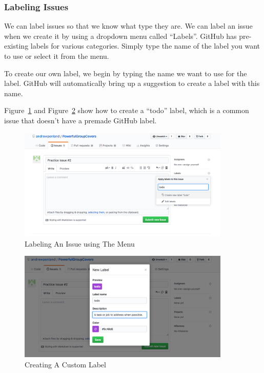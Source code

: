 \documentclass[11pt]{article}
\begin{document}
\subsubsection{Labeling Issues}

We can label issues so that we know what type they are. We can label an issue when we create it by using a dropdown menu called ``Labels''. GitHub has pre-existing labels for various categories. Simply type the name of the label you want to use or select it from the menu. 

To create our own label, we begin by typing the name we want to use for the label. GitHub will automatically bring up a suggestion to create a label with this name.

Figure~\ref{fig:begin-typing-todo} and Figure~\ref{fig:todo-label-details} show how to create a ``todo'' label, which is a common issue that doesn't have a premade GitHub label. 


\begin{figure}\label{fig:begin-typing-todo}
\includegraphics[width=0.9\textwidth]{CreatingLabels}
\caption{Labeling An Issue using The Menu}
\end{figure}

\begin{figure}\label{fig:todo-label-details}
\includegraphics[width=0.9\textwidth]{NewLabelBox}
\caption{Creating A Custom Label}
\end{figure}
\end{document}
